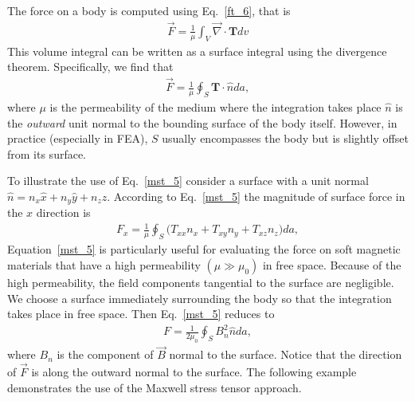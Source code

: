 \documentclass[12pt,a4paper,oneside]{book}
\begin{document}
\begin{onehalfspace}
\begin{equation}
\end{equation}
The force on a body is computed using Eq.~\eqref{ft_6}, that is
\begin{equation*}\label{}
	\begin{aligned}
		\vec{F} = \frac{1}{\mu} \int_{V}\vec{\nabla}\cdot\mathbf{T}dv 
	\end{aligned}
\end{equation*}
This volume integral can be written as a surface integral using the divergence theorem. Specifically, we find that
\begin{equation}\label{mst_5}
	\begin{aligned}
		\vec{F} = \frac{1}{\mu} \oint_{S}\mathbf{T}\cdot\hat{n}da, 
	\end{aligned}
\end{equation}
where $\mu$ is the permeability of the medium where the integration takes place $\hat{n}$ is the \textit{outward} unit normal to the bounding surface of the body itself. However, in practice (especially in FEA), $S$ usually encompasses the body but is slightly offset from its surface.

To illustrate the use of Eq.~\eqref{mst_5} consider a surface with a unit normal $\hat{n}=n_x\hat{x}+n_y\hat{y}+n_z\hat{z}$. According to Eq.~\eqref{mst_5} the magnitude of surface force in the $x$ direction is 
\begin{equation}\label{mst_6}
	\begin{aligned}
		F_x = \frac{1}{\mu} \oint_{S}\Big(T_{xx}n_x+T_{xy}n_y+T_{xz}n_z\Big)da, 
	\end{aligned}
\end{equation}
Equation~\ref{mst_5} is particularly useful for evaluating the force on soft magnetic materials that have a high permeability $(\mu\gg\mu_0)$ in free space. Because of the high permeability, the field components tangential to the surface are negligible. We choose a surface immediately surrounding the body so that the integration takes place in free space. Then Eq.~\eqref{mst_5} reduces to
\begin{equation}\label{mst_7}
	\begin{aligned}
		F = \frac{1}{2\mu_0} \oint_{S}B_n^2\hat{n}da, 
	\end{aligned}
\end{equation}
where $B_n$ is the component of $\vec{B}$ normal to the surface. Notice that the direction of $\vec{F}$ is along the outward normal to the surface. The following example demonstrates the use of the Maxwell stress tensor approach. 


\end{onehalfspace}
\end{document}
